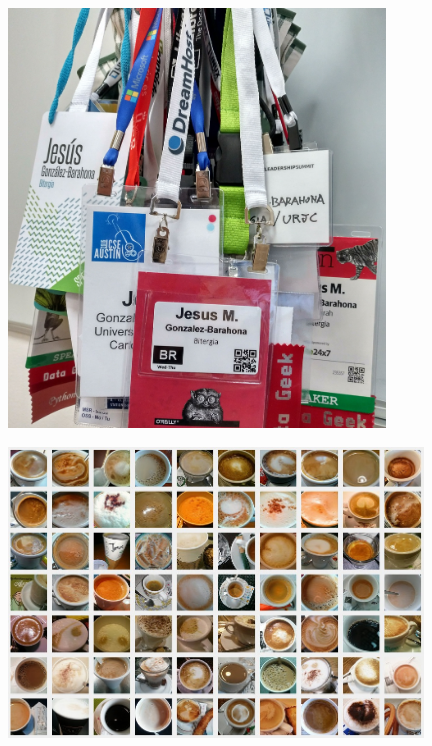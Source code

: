 \begin{frame}[fragile]

  \begin{center}
  \includegraphics[width=10cm]{figs/badges}
  \end{center}  
  
\end{frame}

\begin{frame}[fragile]

  \begin{center}
  \includegraphics[width=11cm]{figs/coffees}
  \end{center}  
  
\end{frame}

